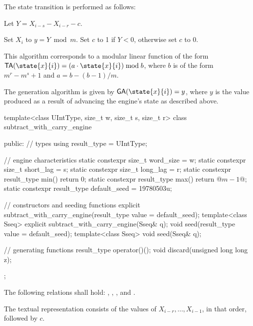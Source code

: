 \pnum
The state transition%
%
is performed as follows:
\begin{enumeratea}
 \item
   Let $ Y = X_{i-s} - X_{i-r} - c $.
 \item
   Set $X_i$ to $ y = Y \bmod m $.
   Set $c$ to 1 if $Y < 0$,
   otherwise set $c$ to 0.
\end{enumeratea}
\begin{note}
 This algorithm corresponds
 to a modular linear function
 of the form
 $ \mathsf{TA}(\state{x}{i}) = (a \cdot \state{x}{i}) \bmod b $,
 where $b$ is of the form
 $ m^r - m^s + 1 $
 and $ a = b - (b-1) / m $.
\end{note}

\pnum
The generation algorithm%
%
is given by
$ \mathsf{GA}(\state{x}{i}) = y $,
where
 $y$
is the value produced
as a result
of advancing the engine's state
as described above.

%
\begin{codeblock}
template<class UIntType, size_t w, size_t s, size_t r>
 class subtract_with_carry_engine
{
public:
 // types
 using result_type = UIntType;

 // engine characteristics
 static constexpr size_t word_size = w;
 static constexpr size_t short_lag = s;
 static constexpr size_t long_lag = r;
 static constexpr result_type min() { return 0; }
 static constexpr result_type max() { return @$m - 1$@; }
 static constexpr result_type default_seed = 19780503u;

 // constructors and seeding functions
 explicit subtract_with_carry_engine(result_type value = default_seed);
 template<class Sseq> explicit subtract_with_carry_engine(Sseq& q);
 void seed(result_type value = default_seed);
 template<class Sseq> void seed(Sseq& q);

 // generating functions
 result_type operator()();
 void discard(unsigned long long z);
};
\end{codeblock}

\pnum
The following relations shall hold:
  ,
  ,
  ,
and
  .

\pnum
The textual representation%
%
consists of the values of
 $X_{i-r}, \ldots, X_{i-1}$,
in that order, followed by $c$.


